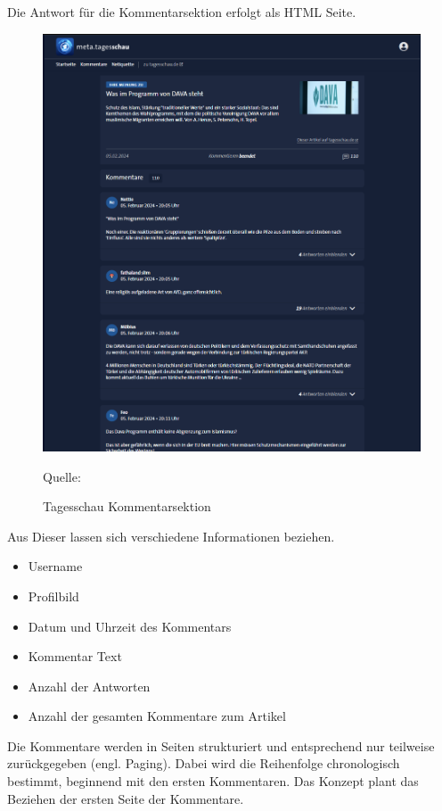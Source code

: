 Die Antwort für die Kommentarsektion erfolgt als HTML Seite. 
\begin{figure}[H]
    \centering
    \includegraphics[width=1\linewidth]{abbildungen/Screenshot Comment Tagesschau.PNG}
    \caption{Tagesschau Kommentarsektion} 
    \label{fig:Tagesschau Kommentarsektion}
    Quelle: 
\end{figure}

Aus Dieser lassen sich verschiedene Informationen beziehen.
\begin{itemize}
    \item Username
    \item Profilbild
    \item Datum und Uhrzeit des Kommentars
    \item Kommentar Text
    \item Anzahl der Antworten
    \item Anzahl der gesamten Kommentare zum Artikel
\end{itemize}

Die Kommentare werden in Seiten strukturiert und entsprechend nur teilweise zurückgegeben (engl. Paging). Dabei wird die Reihenfolge chronologisch bestimmt, beginnend mit den ersten Kommentaren. Das Konzept plant das Beziehen der ersten Seite der Kommentare.

